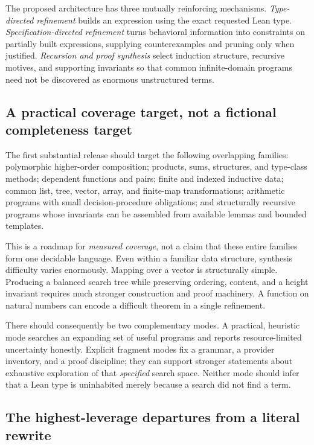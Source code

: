 \documentclass[11pt,letterpaper]{article}
\theoremstyle{definition}
\theoremstyle{remark}
\begin{document}
The proposed architecture has three mutually reinforcing mechanisms. \emph{Type-directed refinement} builds an expression using the exact requested Lean type. \emph{Specification-directed refinement} turns behavioral information into constraints on partially built expressions, supplying counterexamples and pruning only when justified. \emph{Recursion and proof synthesis} select induction structure, recursive motives, and supporting invariants so that common infinite-domain programs need not be discovered as enormous unstructured terms.

\subsection{A practical coverage target, not a fictional completeness target}

The first substantial release should target the following overlapping families: polymorphic higher-order composition; products, sums, structures, and type-class methods; dependent functions and pairs; finite and indexed inductive data; common list, tree, vector, array, and finite-map transformations; arithmetic programs with small decision-procedure obligations; and structurally recursive programs whose invariants can be assembled from available lemmas and bounded templates.

This is a roadmap for \emph{measured coverage}, not a claim that these entire families form one decidable language. Even within a familiar data structure, synthesis difficulty varies enormously. Mapping over a vector is structurally simple. Producing a balanced search tree while preserving ordering, content, and a height invariant requires much stronger construction and proof machinery. A function on natural numbers can encode a difficult theorem in a single refinement.

There should consequently be two complementary modes. A practical, heuristic mode searches an expanding set of useful programs and reports resource-limited uncertainty honestly. Explicit fragment modes fix a grammar, a provider inventory, and a proof discipline; they can support stronger statements about exhaustive exploration of that \emph{specified} search space. Neither mode should infer that a Lean type is uninhabited merely because a search did not find a term.

\subsection{The highest-leverage departures from a literal rewrite}
\end{document}

